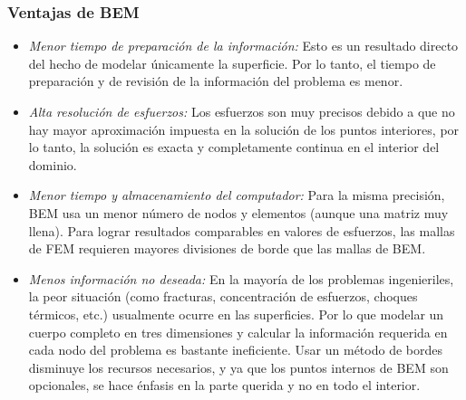 \documentclass[12pt,letterpaper]{article}
\numberwithin{equation}{section}
\begin{document}
\subsubsection{Ventajas de BEM}
\begin{itemize}
	\item \textit{Menor tiempo de preparación de la información:} Esto es un resultado directo del hecho de modelar únicamente la superficie. Por lo tanto, el tiempo de preparación y de revisión de la información del problema es menor. \\
	\item \textit{Alta resolución de esfuerzos:} Los esfuerzos son muy precisos debido a que no hay mayor aproximación impuesta en la solución de los puntos interiores, por lo tanto, la solución es exacta y completamente continua en el interior del dominio.\\
	\item \textit{Menor tiempo y almacenamiento del computador:} Para la misma precisión, BEM usa un menor número de nodos y elementos (aunque una matriz muy llena). Para lograr resultados comparables en valores de esfuerzos, las mallas de FEM requieren mayores divisiones de borde que las mallas de BEM.\\
	\item \textit{Menos información no deseada:} En la mayoría de los problemas ingenieriles, la peor situación (como fracturas, concentración de esfuerzos, choques térmicos, etc.) usualmente ocurre en las superficies. Por lo que modelar un cuerpo completo en tres dimensiones y calcular la información requerida en cada nodo del problema es bastante ineficiente. Usar un método de bordes disminuye los recursos necesarios, y ya que los puntos internos de BEM son opcionales, se hace énfasis en la parte querida y no en todo el interior.
\end{itemize}
\end{document}
